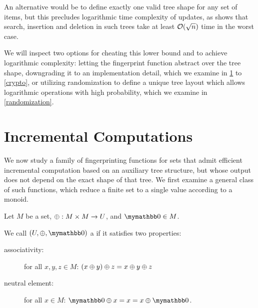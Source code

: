 An alternative would be to define exactly one valid tree shape for any set of items, but this precludes logarithmic time complexity of updates, as \cite{uniquerepresentation} shows that search, insertion and deletion in such trees take at least $\mathcal{O}(\sqrt{n})$ time in the worst case.

We will inspect two options for cheating this lower bound and to achieve logarithmic complexity: letting the fingerprint function abstract over the tree shape, downgrading it to an implementation detail, which we examine in \cref{group-fingerprints} to \cref{crypto}, or utilizing randomization to define a unique tree layout which allows logarithmic operations with high probability, which we examine in \cref{randomization}.

\section{Incremental Computations}
\label{group-fingerprints}

We now study a family of fingerprinting functions for sets that admit efficient incremental computation based on an auxiliary tree structure, but whose output does not depend on the exact shape of that tree. We first examine a general class of such functions, which reduce a finite set to a single value according to a monoid.

\begin{definition}
Let $M$ be a set, $\oplus: M \times M \rightarrow U$, and $\neutraladd \in M$.

We call $(U, \groupaddsym, \neutraladd)$ a  if it satisfies two properties:

  \begin{description}
    \item[associativity:] for all $x, y, z \in M$: ${({x} \oplus {y})} \oplus {z} = {x} \oplus {{y} \oplus{z}}$
    \item[neutral element:] for all $x \in M$: $\groupadd{\neutraladd}{x} = x = \groupadd{x}{\neutraladd}$.
  \end{description}
\end{definition}

